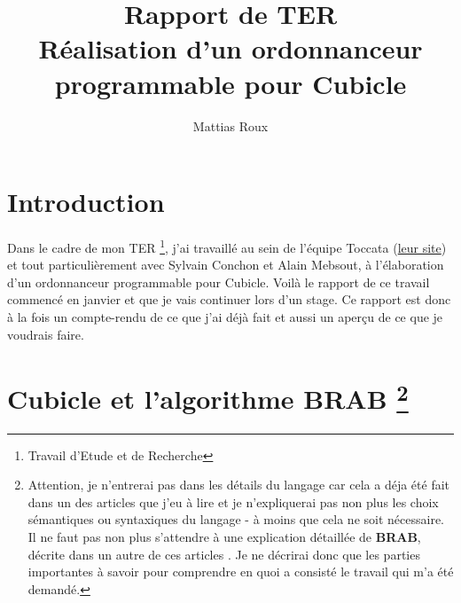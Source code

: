 \documentclass{memoir}
\title{Rapport de TER \\ Réalisation d'un  ordonnanceur programmable pour Cubicle}
\author{Mattias Roux}
\begin{document}
\maketitle

\tableofcontents


\chapter{Introduction}
\label{chap:intro}

	
	Dans le cadre de mon TER \footnote{Travail d'Etude et de Recherche}, j'ai travaillé au sein de l'équipe Toccata (\href{http://toccata.lri.fr/index.fr.html}{leur site}) et tout particulièrement avec Sylvain Conchon et Alain Mebsout, à l'élaboration d'un ordonnanceur programmable pour Cubicle.
	Voilà le rapport de ce travail commencé en janvier et que je vais continuer lors d'un stage. Ce rapport est donc à la fois un compte-rendu de ce que j'ai déjà fait et aussi un aperçu de ce que je voudrais faire.
	
	

	\chapter[Cubicle et l'algorithme BRAB]{Cubicle et l'algorithme BRAB \footnote{Attention, je n'entrerai pas dans les détails du langage car cela a déja été fait dans un des articles que j’eu à lire \cite{Verif} et je n'expliquerai pas non plus les choix sémantiques ou syntaxiques du langage - à moins que cela ne soit nécessaire. Il ne faut pas non plus s'attendre à une explication détaillée de \textbf{BRAB}, décrite dans un autre de ces articles \cite{BRAB}. Je ne décrirai donc que les parties importantes à savoir pour comprendre en quoi a consisté le travail qui m'a été demandé.}}
	\label{chap:cubibrab}
		
\end{document}
